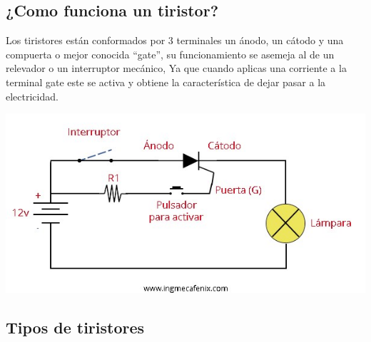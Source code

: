\documentclass[12pt,a4paper]{article}
\begin{document}
\subsection{¿Como funciona un tiristor?}
\begin{flushleft}
Los tiristores están conformados por 3 terminales un ánodo, un cátodo y una compuerta o mejor conocida “gate”, su funcionamiento se asemeja al de un relevador o un interruptor mecánico, Ya que cuando aplicas una corriente a la terminal gate este se activa y obtiene la característica de dejar pasar a la electricidad.
\end{flushleft}
\begin{center}
\includegraphics[scale=0.5]{imagenes/tiristor.JPG} 
\end{center}
\subsection{Tipos de tiristores}
\end{document}
